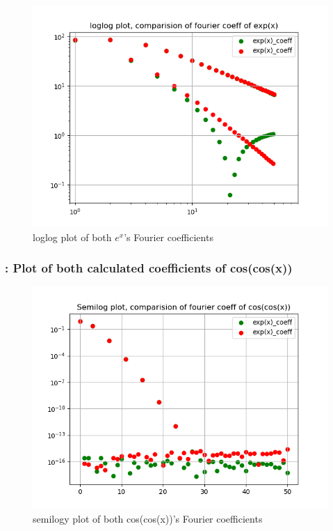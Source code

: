 \documentclass[11pt]{article}
\begin{document}
\begin{figure}[H]
    \centering
    \includegraphics[scale = 0.5]{Figure_12.png}
    \caption{loglog plot of both $e^{x}$'s Fourier coefficients}
\end{figure}

\subsubsection{: Plot of both calculated coefficients of cos(cos(x))}

\begin{figure}[H]
    \centering
    \includegraphics[scale = 0.5]{Figure_13.png}
    \caption{semilogy plot of both cos(cos(x))'s Fourier coefficients}
\end{figure}
\end{document}
